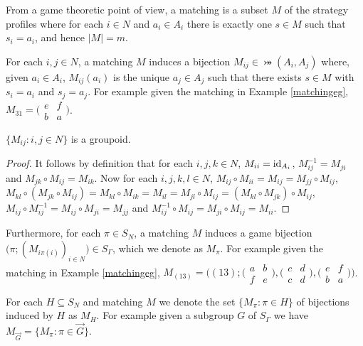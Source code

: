From a game theoretic point of view, a matching is a subset $M$ of the strategy profiles where for each $i \in N$ and $a_i \in A_i$ there is exactly one $s \in M$ such that $s_i = a_i$, and hence $|M| = m$. 

For each $i, j \in N$, a matching $M$ induces a bijection $M_{ij} \in \bij(A_i, A_j)$ where, given $a_i \in A_i$, $M_{ij}(a_i)$ is the unique $a_j \in A_j$ such that there exists $s \in M$ with $s_i = a_i$ and $s_j = a_j$. For example given the matching in Example \ref{matchingeg}, $M_{31} = \bigl(\begin{smallmatrix} e & f \\ b & a \end{smallmatrix}\bigr)$.

\begin{lemma}
	$\{M_{ij}: i, j \in N\}$ is a groupoid. 
	\begin{proof}
		It follows by definition that for each $i, j, k \in N$, $M_{ii} = \text{id}_{A_i}$, $M_{ij}^{-1} = M_{ji}$ and $M_{jk} \circ M_{ij} = M_{ik}$. Now for each $i, j, k, l \in N$, $M_{ij} \circ M_{ii} = M_{ij} = M_{jj} \circ M_{ij}$, $M_{kl} \circ (M_{jk} \circ M_{ij}) = M_{kl} \circ M_{ik} = M_{il} = M_{jl} \circ M_{ij} = (M_{kl} \circ M_{jk}) \circ M_{ij}$, $M_{ij} \circ M_{ij}^{-1} = M_{ij} \circ M_{ji} = M_{jj}$ and $M_{ij}^{-1} \circ M_{ij} = M_{ji} \circ M_{ij} = M_{ii}$.
	\end{proof}
\end{lemma}

Furthermore, for each $\pi \in S_N$, a matching $M$ induces a game bijection $\bigl(\pi; (M_{i\pi(i)})_{i \in N}\bigr) \in S_{\Gamma}$, which we denote as $M_{\pi}$. For example given the matching in Example \ref{matchingeg}, $M_{(13)} = \bigl((13) ; \bigl(\begin{smallmatrix} a & b \\ f & e \end{smallmatrix}\bigr), \bigl(\begin{smallmatrix} c & d \\ c & d \end{smallmatrix}\bigr), \bigl(\begin{smallmatrix} e & f \\ b & a \end{smallmatrix}\bigr)\bigr)$. 

For each $H \subseteq S_N$ and matching $M$ we denote the set $\{M_{\pi}: \pi \in H\}$ of bijections induced by $H$ as $M_H$. For example given a subgroup $G$ of $S_{\Gamma}$ we have $M_{\overrightarrow{G}} = \{M_{\pi}: \pi \in \overrightarrow{G}\}$. 

